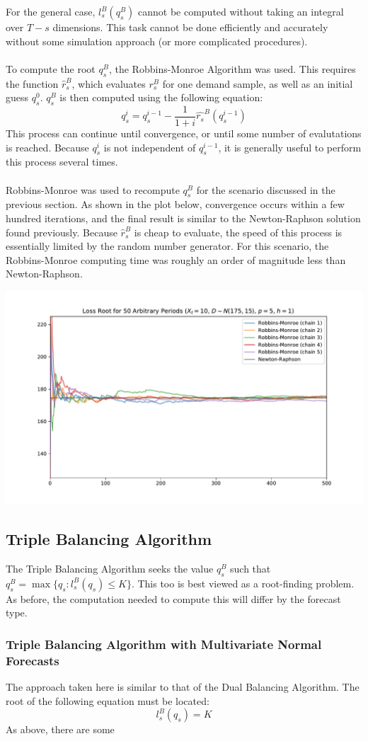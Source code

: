 \documentclass[12pt]{article}
\begin{document}
For the general case, $l_s^B(q_s^B)$ cannot be computed without taking an integral over $T-s$ dimensions. This task cannot be done efficiently and accurately without some simulation approach (or more complicated procedures). \\
\\
To compute the root $q_s^B$, the Robbins-Monroe Algorithm was used. This requires the function $\hat{r}_s^B$, which evaluates $r_s^B$ for one demand sample, as well as an initial guess $q_s^0$. $q_s^B$ is then computed using the following equation:
$$
	q_s^i = q_s^{i-1} - \frac{1}{1 + i} \hat{r_s}^B(q_s^{i-1})
$$
This process can continue until convergence, or until some number of evalutations is reached. Because $q_s^i$ is not independent of $q_s^{i-1}$, it is generally useful to perform this process several times.\\
\\
Robbins-Monroe was used to recompute $q_s^B$ for the scenario discussed in the previous section. As shown in the plot below, convergence occurs within a few hundred iterations, and the final result is similar to the Newton-Raphson solution found previously. Because $\hat{r}_s^B$ is cheap to evaluate, the speed of this process is essentially limited by the random number generator. For this scenario, the Robbins-Monroe computing time was roughly an order of magnitude less than Newton-Raphson. 

\includegraphics[width=\textwidth]{rbtraces}

\subsection{Triple Balancing Algorithm}

The Triple Balancing Algorithm seeks the value $q_s^B$ such that $q_s^B = \max\{q_s : l_s^B(q_s) \leq K\}$. This too is best viewed as a root-finding problem. As before, the computation needed to compute this will differ by the forecast type. 

\subsubsection{Triple Balancing Algorithm with Multivariate Normal Forecasts}

The approach taken here is similar to that of the Dual Balancing Algorithm. The root of the following equation must be located:
$$
	l_s^B(q_s) = K
$$ 
As above, there are some 



\end{document}
